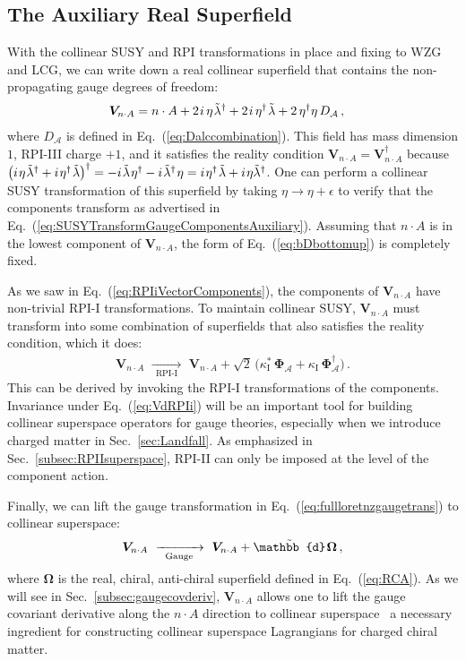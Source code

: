 \documentclass[12pt,document,nofootinbib,superscriptaddress,onecolumn,preprintnumbers,balancelastpage]{article}
\newcommand{\rpii}{{\kappa_\text{I}}}
\newcommand{\rpiiC}{{\kappa^*_\text{I}}}
\newcommand{\s}{\hspace{0.8pt}}
\newcommand{\PP}{\mathbb{d}}
\newcommand{\RPIi}{\,\,\xrightarrow[\hspace{5pt}\text{RPI-I}\hspace{5pt}]{}\,\,}
\newcommand{\gauge}{\,\,\xrightarrow[\hspace{5pt}\text{Gauge}\hspace{5pt}]{}\,\,}
\DeclareRobustCommand{\Sec}[1]{Sec.~\ref{#1}}
\DeclareRobustCommand{\Eq}[1]{Eq.~(\ref{#1})}
\newcommand{\bD}{ \boldsymbol{V}_{n \cdot A}}
\newcommand{\bPhialc}{ \boldsymbol{\Phi}_\alc}
\newcommand{\RCA}{\boldsymbol{\Omega}}
\newcommand{\alc}{\mathcal{A}}
\begin{document}
\begin{spacing}{1.2}
\subsection{The Auxiliary Real Superfield}
\label{subsec:auxvector}

With the collinear SUSY and RPI transformations in place and fixing to WZG and LCG, we can write down a real collinear superfield that contains the non-propagating gauge degrees of freedom:
%
\begin{align}
\label{eq:bDbottomup}
\bD  &  =  n \cdot A +  2\s i\,  \eta\s \tilde{\lambda}^{\dagger}  + 2\s  i\,   \eta^\dagger\s \tilde{\lambda} + 2\, \eta^\dagger \eta\, D_\alc \,,
\end{align}
%
where $D_\alc$ is defined in \Eq{eq:Dalccombination}.
%
This field has mass dimension $1$, RPI-III charge $+1$, and it satisfies the reality condition $\bD = \bD^\dagger$ because $\big(i\s \eta\s \tilde{\lambda}^\dagger +  i\s \eta^\dagger\s \tilde{\lambda} \big)^\dagger = - i\s \tilde{\lambda}\s \eta^\dagger - i \s\tilde{\lambda}^\dagger\s \eta = i\s \eta^\dagger\s \tilde{\lambda} + i\s \eta \tilde{\lambda}^\dagger$.
%
One can perform a collinear SUSY transformation of this superfield by taking $\eta \to \eta + \epsilon$ to verify that the components transform as advertised in \Eq{eq:SUSYTransformGaugeComponentsAuxiliary}.
%
Assuming that $n \cdot A$ is in the lowest component of $\bD$, the form of \Eq{eq:bDbottomup} is completely fixed. 


As we saw in \Eq{eq:RPIiVectorComponents}, the components of $\bD$ have non-trivial RPI-I transformations.
%
To maintain collinear SUSY, $\bD$ must transform into some combination of superfields that also satisfies the reality condition, which it does:
%
\begin{align}
\label{eq:VdRPIi}
\bD \RPIi \bD + \sqrt{2}\, \Big( \rpiiC \, \bPhialc + \rpii\, \bPhialc^\dagger \Big) \,.
\end{align}
%
This can be derived by invoking the RPI-I transformations of the components.
%
Invariance under \Eq{eq:VdRPIi} will be an important tool for building collinear superspace operators for gauge theories, especially when we introduce charged matter in \Sec{sec:Landfall}.
%
As emphasized in \Sec{subsec:RPIIsuperspace}, RPI-II can only be imposed at the level of the component action.


Finally, we can lift the gauge transformation in \Eq{eq:fullloretnzgaugetrans} to collinear superspace: 
%
\begin{align}
\bD \gauge \bD + \tilde{\PP}\s \RCA\,,
\label{eq:Dgauge}
\end{align}
%
where $\RCA$ is the real, chiral, anti-chiral superfield defined in \Eq{eq:RCA}.
%
As we will see in \Sec{subsec:gaugecovderiv}, $\bD$ allows one to lift the gauge covariant derivative along the $n \cdot A$ direction to collinear superspace \textemdash\ a necessary ingredient for constructing collinear superspace Lagrangians for charged chiral matter. 




\end{spacing}
\end{document}
